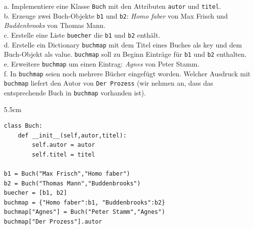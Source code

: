
\question[8]
a. Implementiere eine Klasse \texttt{Buch} mit den Attributen
\texttt{autor} und \texttt{titel}.  \\
b. Erzeuge zwei Buch-Objekte \texttt{b1} und \texttt{b2}:
\textit{Homo faber} von Max Frisch
   und \textit{Buddenbrooks} von Thomas Mann. \\
c. Erstelle eine Liste \texttt{buecher} die \texttt{b1}
und \texttt{b2} enthält. \\
d. Erstelle ein Dictionary \texttt{buchmap} mit dem Titel
eines Buches als key und dem Buch-Objekt als value.
\texttt{buchmap} soll zu Beginn Einträge für \texttt{b1} und \texttt{b2} enthalten. \\
e. Erweitere \texttt{buchmap} um einen Eintrag: \textit{Agnes} von Peter Stamm. \\
f. In \texttt{buchmap} seien noch mehrere Bücher eingefügt worden.
 Welcher Ausdruck mit \texttt{buchmap}
 liefert den Autor von \texttt{Der Prozess} (wir nehmen an,
   dass das entsprechende Buch in \texttt{buchmap} vorhanden ist).


\begin{solutionbox}{5.5cm}
\begin{lstlisting}
class Buch:
    def __init__(self,autor,titel):
        self.autor = autor
        self.titel = titel

b1 = Buch("Max Frisch","Homo faber")
b2 = Buch("Thomas Mann","Buddenbrooks")
buecher = [b1, b2]
buchmap = {"Homo faber":b1, "Buddenbrooks":b2}
buchmap["Agnes"] = Buch("Peter Stamm","Agnes")
buchmap["Der Prozess"].autor
\end{lstlisting}
\end{solutionbox}
